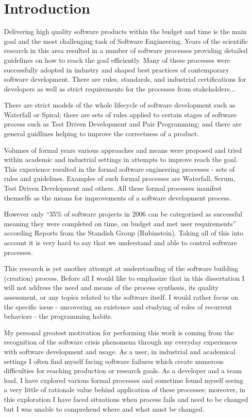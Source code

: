 \chapter{Introduction}
Delivering high quality software products within the budget and time is the main goal and the most challenging task of Software Engineering. Years of the scientific research in this area resulted in a number of software processes providing detailed guidelines on how to reach the goal efficiently. Many of these processes were successfully adopted in industry and shaped best practices of contemporary software development. There are rules, standards, and industrial certifications for developers as well as strict requirements for the processes from stakeholders... 

There are strict models of the whole lifecycle of software development such as Waterfall or Spiral; there are sets of rules applied to certain stages of software process such as Test Driven Development and Pair Programming; and there are general guidlines helping to improve the correctness of a product.

Volumes of formal years various approaches and means were proposed and tried within academic and industrial settings in attempts to improve reach the goal. This experience resulted in the formal software engineering processes - sets of rules and guidelines. Examples of such formal processes are  Waterfall, Scrum, Test Driven Development and others. All these formal processes manifest themselfs as the means for improvements of a software development process. 

However only ``35\% of software projects in 2006 can be categorized as successful meaning they were completed on time, on budget and met user requirements'' according Reports from the Standish Group (Rubinstein). Taking all of this into account it is very hard to say that we understand and able to control software processes.

This research is yet another attempt at understanding of the software building (creation) process. Before all I would like to emphasize that in this dissertation I will not address the need and means of the process synthesis, its quality assessment, or any topics related to the software itself. I would rather focus on the specific issue - uncovering an existence and studying of roles of recurrent behaviors - the programming habits. 

My personal greatest motivation for performing this work is coming from the recognition of the software crisis phenomena through my everyday experiences with software development and usage. As a user, in industrial and academical settings I often find myself facing software failures which create numerous difficulties for reaching production or research goals. As a developer and a team lead, I have explored various formal processes and sometime found myself seeing a very little of rationale value behind application of these processes; moreover, in this exploration I have faced situations when process fails and need to be changed but I was unable to comprehend where and what must be changed. 

